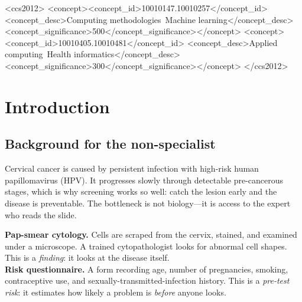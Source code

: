 \documentclass[sigplan,nonacm,screen]{acmart}
\begin{document}
\begin{CCSXML}
<ccs2012>
<concept><concept_id>10010147.10010257</concept_id>
<concept_desc>Computing methodologies~Machine learning</concept_desc>
<concept_significance>500</concept_significance></concept>
<concept><concept_id>10010405.10010481</concept_id>
<concept_desc>Applied computing~Health informatics</concept_desc>
<concept_significance>300</concept_significance></concept>
</ccs2012>
\end{CCSXML}


\maketitle

\section{Introduction}

\subsection{Background for the non-specialist}

Cervical cancer is caused by persistent infection with high-risk human papillomavirus (HPV). It progresses slowly through detectable pre-cancerous stages, which is why screening works so well: catch the lesion early and the disease is preventable. The bottleneck is not biology---it is access to the expert who reads the slide.

\begin{defbox}
\textbf{Pap-smear cytology.} Cells are scraped from the cervix, stained, and examined under a microscope. A trained cytopathologist looks for abnormal cell shapes. This is a \emph{finding}: it looks at the disease itself.\\[3pt]
\textbf{Risk questionnaire.} A form recording age, number of pregnancies, smoking, contraceptive use, and sexually-transmitted-infection history. This is a \emph{pre-test risk}: it estimates how likely a problem is \emph{before} anyone looks.
\end{defbox}
\end{document}
